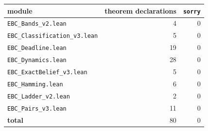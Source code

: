 \begin{tabular}{lrr}
\toprule
module & theorem declarations & \texttt{sorry}\\
\midrule
\texttt{EBC\_Bands\_v2.lean} & 4 & 0\\
\texttt{EBC\_Classification\_v3.lean} & 5 & 0\\
\texttt{EBC\_Deadline.lean} & 19 & 0\\
\texttt{EBC\_Dynamics.lean} & 28 & 0\\
\texttt{EBC\_ExactBelief\_v3.lean} & 5 & 0\\
\texttt{EBC\_Hamming.lean} & 6 & 0\\
\texttt{EBC\_Ladder\_v2.lean} & 2 & 0\\
\texttt{EBC\_Pairs\_v3.lean} & 11 & 0\\
\textbf{total} & 80 & 0\\
\bottomrule
\end{tabular}
